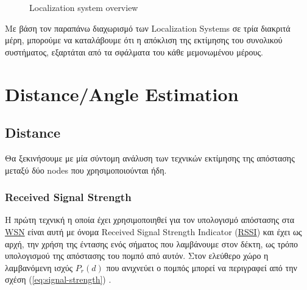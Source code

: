 \begin{figure} [H]
{
	}
	\decoRule
	\caption[Localization-system-overview]{Localization system overview}
	\label{fig:Localization-system}
\end{figure}

Με βάση τον παραπάνω διαχωρισμό των Localization Systems σε τρία διακριτά μέρη, μπορούμε να καταλάβουμε
ότι η απόκλιση της εκτίμησης του συνολικού συστήματος, εξαρτάται από τα σφάλματα  του κάθε μεμονωμένου μέρους.

\section{Distance/Angle Estimation} \label{sec:Chapter2-1} 

\subsection{Distance}\label{sec:Chapter2-1-1}

Θα ξεκινήσουμε με μία σύντομη ανάλυση των τεχνικών εκτίμησης της απόστασης μεταξύ δύο nodes
που χρησιμοποιούνται ήδη. 

\subsubsection{Received Signal Strength}
Η πρώτη τεχνική η οποία έχει χρησιμοποιηθεί για τον υπολογισμό απόστασης στα 
\hyperref[abbr:WSN]{WSN} είναι αυτή με όνομα Received Signal Strength Indicator
(\hyperref[abbr:RSSI]{RSSI}) και έχει ως αρχή, την χρήση της έντασης ενός 
σήματος που λαμβάνουμε στον δέκτη, ως τρόπο υπολογισμού της απόστασης
του πομπό από αυτόν. Στον ελεύθερο χώρο η λαμβανόμενη ισχύς $P_r(d)$ που ανιχνεύει ο πομπός
μπορεί να περιγραφεί από την σχέση (\ref{eq:signal-strength}) \cite{wsn-Localization-techniques}.

